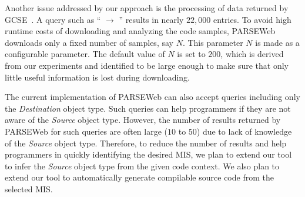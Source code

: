 Another issue addressed by our approach is the processing of data
returned by GCSE~\cite{GCSE}. A query such as
`` $\rightarrow$ '' results in
nearly $22,000$ entries. To avoid high runtime costs of downloading and analyzing
the code samples, PARSEWeb downloads only a fixed number of
samples, say $N$. This parameter $N$ is made as a configurable
parameter. The default value of $N$ is set to $200$, which is derived
from our experiments and identified to be large enough to make sure
that only little useful information is lost during downloading.

The current implementation of PARSEWeb can also accept queries
including only the \emph{Destination} object type. Such queries can
help programmers if they are not aware of the \emph{Source} object
type. However, the number of results returned by PARSEWeb for such
queries are often large ($10$ to $50$) due to lack of knowledge of
the \emph{Source} object type. Therefore, to reduce the number of
results and help programmers in quickly identifying the desired MIS,
we plan to extend our tool to infer the \emph{Source} object type
from the given code context. We also plan to extend our tool to
automatically generate compilable source code from the selected MIS.
